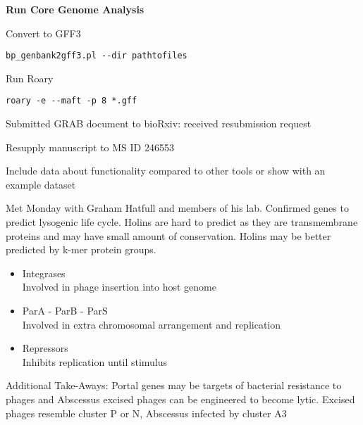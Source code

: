 \documentclass[idxtotoc,hyperref,openany]{labbook} %
\begin{document}
\textbf{Run Core Genome Analysis}

\vspace{0.3cm}

Convert to GFF3

\begin{verbatim}
bp_genbank2gff3.pl --dir pathtofiles
\end{verbatim}


Run Roary

\begin{verbatim}
roary -e --maft -p 8 *.gff
\end{verbatim}






Submitted GRAB document to bioRxiv: received resubmission request

Resupply manuscript to MS ID 246553

Include data about functionality compared to other tools or show with an example dataset





Met Monday with Graham Hatfull and members of his lab. Confirmed genes to predict lysogenic life cycle. Holins are hard to predict as they are transmembrane proteins and may have small amount of conservation. Holins may be better predicted by k-mer protein groups. 

\begin{itemize}
\item Integrases \\
Involved in phage insertion into host genome
\item ParA - ParB - ParS \\
Involved in extra chromosomal arrangement and replication
\item Repressors \\
Inhibits replication until stimulus 
\end{itemize}

Additional Take-Aways: Portal genes may be targets of bacterial resistance to phages and Abscessus excised phages can be engineered to become lytic.  Excised phages resemble cluster P or N, Abscessus infected by cluster A3\\
\end{document}
